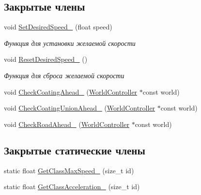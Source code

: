 \subsection*{Закрытые члены}
\begin{DoxyCompactItemize}
\item 
\mbox{\label{classrtm_1_1_car_object_a7b2f6f775bca42de1f8a171967ef4a5b}} 
void \hyperlink{classrtm_1_1_car_object_a7b2f6f775bca42de1f8a171967ef4a5b}{Set\+Desired\+Speed\+\_\+} (float speed)
\begin{DoxyCompactList}\small\item\em Функция для установки желаемой скорости \end{DoxyCompactList}\item 
\mbox{\label{classrtm_1_1_car_object_ac7d862334533fc10e079cec616f1c143}} 
void \hyperlink{classrtm_1_1_car_object_ac7d862334533fc10e079cec616f1c143}{Reset\+Desired\+Speed\+\_\+} ()
\begin{DoxyCompactList}\small\item\em Функция для сброса желаемой скорости \end{DoxyCompactList}\item 
void \hyperlink{classrtm_1_1_car_object_a9e80c9029d84c425b43d6a0559d0c76c}{Check\+Coating\+Ahead\+\_\+} (\hyperlink{classrtm_1_1_world_controller}{World\+Controller} $\ast$const world)
\item 
void \hyperlink{classrtm_1_1_car_object_a0cd1f15e3b28edde4271b92da250339f}{Check\+Coating\+Union\+Ahead\+\_\+} (\hyperlink{classrtm_1_1_world_controller}{World\+Controller} $\ast$const world)
\item 
void \hyperlink{classrtm_1_1_car_object_a8d8a11c484ce1afd532b78688345f314}{Check\+Road\+Ahead\+\_\+} (\hyperlink{classrtm_1_1_world_controller}{World\+Controller} $\ast$const world)
\end{DoxyCompactItemize}
\subsection*{Закрытые статические члены}
\begin{DoxyCompactItemize}
\item 
static float \hyperlink{classrtm_1_1_car_object_a0e69f04edd9f51f57a1d0fd39e2b0976}{Get\+Class\+Max\+Speed\+\_\+} (size\+\_\+t id)
\item 
static float \hyperlink{classrtm_1_1_car_object_a45d798bf2079173c677358b4b54d4e2b}{Get\+Class\+Acceleration\+\_\+} (size\+\_\+t id)
\end{DoxyCompactItemize}

